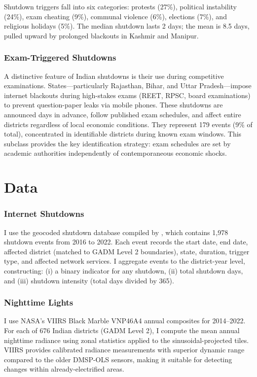 \documentclass[12pt]{article}
\begin{document}
Shutdown triggers fall into six categories: protests (27\%), political instability (24\%), exam cheating (9\%), communal violence (6\%), elections (7\%), and religious holidays (5\%). The median shutdown lasts 2 days; the mean is 8.5 days, pulled upward by prolonged blackouts in Kashmir and Manipur.

\subsubsection*{Exam-Triggered Shutdowns} A distinctive feature of Indian shutdowns is their use during competitive examinations. States---particularly Rajasthan, Bihar, and Uttar Pradesh---impose internet blackouts during high-stakes exams (REET, RPSC, board examinations) to prevent question-paper leaks via mobile phones. These shutdowns are announced days in advance, follow published exam schedules, and affect entire districts regardless of local economic conditions. They represent 179 events (9\% of total), concentrated in identifiable districts during known exam windows. This subclass provides the key identification strategy: exam schedules are set by academic authorities independently of contemporaneous economic shocks.


\section{Data}

\subsubsection*{Internet Shutdowns} I use the geocoded shutdown database compiled by \citet{koning2023shutdowns}, which contains 1,978 shutdown events from 2016 to 2022. Each event records the start date, end date, affected district (matched to GADM Level 2 boundaries), state, duration, trigger type, and affected network services. I aggregate events to the district-year level, constructing: (i) a binary indicator for any shutdown, (ii) total shutdown days, and (iii) shutdown intensity (total days divided by 365).

\subsubsection*{Nighttime Lights} I use NASA's VIIRS Black Marble VNP46A4 annual composites \citep{roman2018nasa, elvidge2017viirs} for 2014--2022. For each of 676 Indian districts (GADM Level 2), I compute the mean annual nighttime radiance using zonal statistics applied to the sinusoidal-projected tiles. VIIRS provides calibrated radiance measurements with superior dynamic range compared to the older DMSP-OLS sensors, making it suitable for detecting changes within already-electrified areas.
\end{document}
